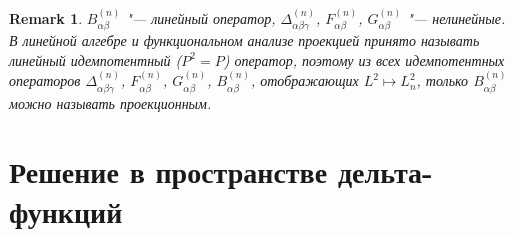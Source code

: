 \documentclass{article}
\newtheorem{remark}{Remark}
\begin{document}
\begin{remark}
    \(B^{(n)}_{\alpha\beta}\) "--- линейный оператор,
    \(\Delta^{(n)}_{\alpha\beta\gamma}\), \(F^{(n)}_{\alpha\beta}\), \(G^{(n)}_{\alpha\beta}\) "--- нелинейные.
    В линейной алгебре и функциональном анализе проекцией принято называть линейный идемпотентный (\(P^2=P\)) оператор,
    поэтому из всех идемпотентных операторов
    \(\Delta^{(n)}_{\alpha\beta\gamma}\), \(F^{(n)}_{\alpha\beta}\), \(G^{(n)}_{\alpha\beta}\), \(B^{(n)}_{\alpha\beta}\),
    отображающих \(L^2 \mapsto L^2_n\), только \(B^{(n)}_{\alpha\beta}\) можно называть проекционным.
\end{remark}

\section{Решение в пространстве дельта-функций}
\end{document}
